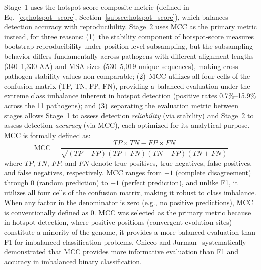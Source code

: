 Stage~1 uses the hotspot-score composite metric (defined in Eq.~\ref{eq:hotspot_score}, Section~\ref{subsec:hotspot_score}), which balances detection accuracy with reproducibility.
Stage~2 uses MCC as the primary metric instead, for three reasons:
(1)~the stability component of hotspot-score measures bootstrap reproducibility under position-level subsampling, but the subsampling behavior differs fundamentally across pathogens with different alignment lengths (340--1,330 AA) and MSA sizes (530--5,019 unique sequences), making cross-pathogen stability values non-comparable;
(2)~MCC utilizes all four cells of the confusion matrix (TP, TN, FP, FN), providing a balanced evaluation under the extreme class imbalance inherent in hotspot detection (positive rates 0.7\%--15.9\% across the 11 pathogens);
and (3)~separating the evaluation metric between stages allows Stage~1 to assess detection \textit{reliability} (via stability) and Stage~2 to assess detection \textit{accuracy} (via MCC), each optimized for its analytical purpose.
MCC is formally defined as:
\begin{equation}
\text{MCC} = \frac{TP \times TN - FP \times FN}{\sqrt{(TP+FP)(TP+FN)(TN+FP)(TN+FN)}}
\label{eq:mcc}
\end{equation}
where $TP$, $TN$, $FP$, and $FN$ denote true positives, true negatives, false positives, and false negatives, respectively.
MCC ranges from $-1$ (complete disagreement) through $0$ (random prediction) to $+1$ (perfect prediction), and unlike F1, it utilizes all four cells of the confusion matrix, making it robust to class imbalance.
When any factor in the denominator is zero (e.g., no positive predictions), MCC is conventionally defined as 0.
MCC was selected as the primary metric because in hotspot detection, where positive positions (convergent evolution sites) constitute a minority of the genome, it provides a more balanced evaluation than F1 for imbalanced classification problems. Chicco and Jurman~\cite{chicco2020mcc} systematically demonstrated that MCC provides more informative evaluation than F1 and accuracy in imbalanced binary classification.

